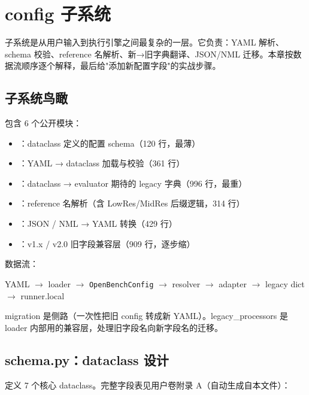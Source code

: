 
\chapter{config 子系统}

 子系统是从用户输入到执行引擎之间最复杂的一层。它负责：YAML 解析、schema 校验、reference 名解析、新→旧字典翻译、JSON/NML 迁移。本章按数据流顺序逐个解释，最后给"添加新配置字段"的实战步骤。

\section{子系统鸟瞰}

 包含 6 个公开模块：

\begin{itemize}
  \item {}：dataclass 定义的配置 schema（120 行，最薄）
  \item {}：YAML → dataclass 加载与校验（361 行）
  \item {}：dataclass → evaluator 期待的 legacy 字典（996 行，最重）
  \item {}：reference 名解析（含 LowRes/MidRes 后缀逻辑，314 行）
  \item {}：JSON / NML → YAML 转换（429 行）
  \item {}：v1.x / v2.0 旧字段兼容层（909 行，逐步缩）
\end{itemize}

数据流：

\begin{center}
\small
YAML \(\to\) loader \(\to\) \texttt{OpenBenchConfig} \(\to\) resolver \(\to\) adapter \(\to\) legacy dict \(\to\) runner.local
\end{center}

migration 是侧路（一次性把旧 config 转成新 YAML）。legacy\_processors 是 loader 内部用的兼容层，处理旧字段名向新字段名的迁移。

\section{schema.py：dataclass 设计}

 定义 7 个核心 dataclass。完整字段表见用户卷附录 A（自动生成自本文件）：

